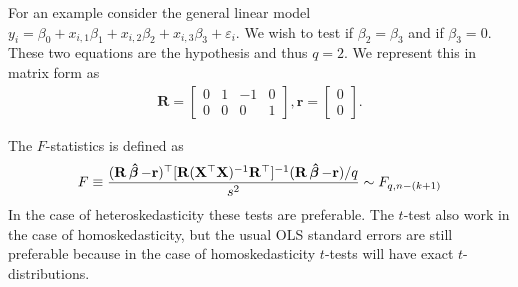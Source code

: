 For an example consider the general linear model $y_i = \beta_0 + x_{i,1}\beta_{1} + x_{i,2}\beta_{2} + x_{i,3}\beta_{3} + \varepsilon_i$. We wish to test if $\beta_2 = \beta_3$ and if $\beta_3 = 0$. These two equations are the hypothesis and thus $q = 2$. We represent this in matrix form as
\begin{align*}
    \mathbf{R} = \begin{bmatrix}0 & 1 & -1 & 0\\
    0 & 0 & 0 & 1\end{bmatrix}, \mathbf{r} = \begin{bmatrix}0\\0\end{bmatrix}.
\end{align*}

The $F$-statistics is defined as
\begin{align*}
    F &\equiv \dfrac{(\mathbf{R}\operatorname{\boldsymbol{\hat{\beta}}} - \mathbf{r})^\top  [\mathbf{R}(\mathbf{X}^\top \mathbf{X})^{-1}\mathbf{R}^\top]^{-1}  (\mathbf{R}\operatorname{\boldsymbol{\hat{\beta}}}- \mathbf{r}) / q}{s^2} \sim F_{q, n - (k+1)}\\
\end{align*}
In the case of heteroskedasticity these tests are preferable. 
The $t$-test also work in the case of homoskedasticity, but the usual OLS standard errors are still preferable because in the case of homoskedasticity $t$-tests will have exact $t$-distributions. 

